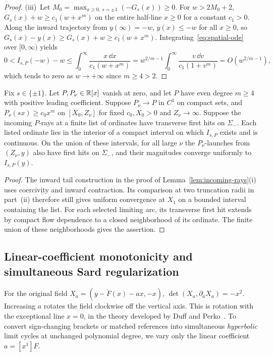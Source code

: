 \begin{proof}
(iii)~Let $M_0=\max_{x\ge 0,\ s=\pm 1}(-G_s(x))\ge 0$. For $w>2M_0+2$, $G_s(x)+w\ge c_1(w+x^m)$ on the entire half-line $x\ge 0$ for a constant $c_1>0$. Along the inward trajectory from $y(\infty)=-w$, $y(x)\le -w$ for all $x\ge 0$, so $G_s(x)-y(x)\ge G_s(x)+w\ge c_1(w+x^m)$. Integrating~\eqref{eq:spatial-ode} over $[0,\infty)$ yields
\[
  0 < I_{s,P}(-w)-w \le \int_0^\infty\frac{x\,\dd x}{c_1(w+x^m)} = w^{2/m-1}\int_0^\infty\frac{v\,\dd v}{c_1(1+v^m)} = O\!\left(w^{2/m-1}\right),
\]
which tends to zero as $w\to+\infty$ since $m\ge 4>2$.
\end{proof}

\begin{localcorollary}\label{cor:transverse-entry}
Fix $s\in\{\pm1\}$. Let $P,P_\nu\in\mathbb{R}[x]$ vanish at zero, and let
$P$ have even degree $m\ge4$ with positive leading coefficient. Suppose
$P_\nu\to P$ in $C^1$ on compact sets, and $P_\nu(sx)\ge c_0x^m$
on $[X_0,Z_\nu]$ for fixed $c_0,X_0>0$ and $Z_\nu\to\infty$.
Suppose the incoming $P$-rays at a finite list of ordinates have
transverse first hits on $\Sigma_-$. Each listed ordinate lies in the
interior of a compact interval on which $I_{s,P}$ exists and is
continuous. On the union of these intervals, for all large $\nu$ the
$P_\nu$-launches from $(Z_\nu,y)$ also have first hits on $\Sigma_-$,
and their magnitudes converge uniformly to $I_{s,P}(y)$.
\end{localcorollary}

\begin{proof}
The inward tail construction in the proof of Lemma~\ref{lem:incoming-rays}(i)
uses coercivity and inward contraction. Its comparison at two truncation
radii in part~(ii) therefore still gives uniform convergence at $X_1$
on a bounded interval containing the list. For each selected limiting
arc, its transverse first hit extends by compact flow dependence to a
closed neighborhood of its ordinate. The finite union of these
neighborhoods gives the assertion.
\end{proof}

\subsection{Linear-coefficient monotonicity and simultaneous Sard regularization}\label{subsec:regularization}
For the original field $X_a=(y-\mathring F(x)-ax,-x)$,
$\det(X_a,\partial_a X_a)=-x^2$. Increasing $a$ rotates the field clockwise
off the vertical axis. This is rotation with the exceptional line $x=0$, in the theory developed by Duff and Perko~\cite{Duff1953,Perko1975,Perko1993}.
To convert sign-changing brackets or matched references into simultaneous \emph{hyperbolic} limit cycles at unchanged polynomial degree, we vary only the linear coefficient $a=[x^1]F$.

